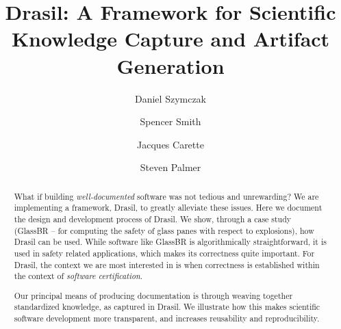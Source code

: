 \documentclass[sigconf]{acmart}
\begin{document}
\title[Drasil Framework]{Drasil: A Framework for Scientific Knowledge Capture and Artifact Generation}

\author{Daniel Szymczak}

\author{Spencer Smith}

\author{Jacques Carette}

\author{Steven Palmer}

\begin{abstract}
What if building \emph{well-documented} software was not tedious and unrewarding?  We
are implementing a framework, Drasil, to greatly alleviate these issues. Here
we document the design and development process of Drasil.  We show, through a case
study (GlassBR -- for computing the safety of glass panes with respect to
explosions), how Drasil can be used. While software like GlassBR is algorithmically
straightforward, it is used in safety related applications, which makes its correctness
quite important. For Drasil, the context we are most interested in is when correctness is
established within the context of \emph{software certification}.

Our principal means of producing documentation is through weaving together
standardized knowledge, as captured in Drasil.  We illustrate how this makes
scientific software development more transparent, and increases reusability and
reproducibility.
\end{abstract}

%
%
\end{document}
